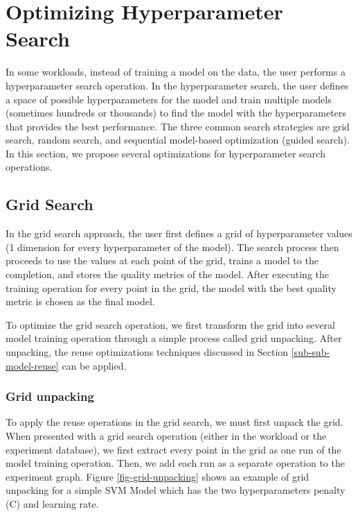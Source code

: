 \section{Optimizing Hyperparameter Search} \label{sec-hyperparam-optimization}
In some workloads, instead of training a model on the data, the user performs a hyperparameter search operation.
In the hyperparameter search, the user defines a space of possible hyperparameters for the model and train multiple models (sometimes hundreds or thousands) to find the model with the hyperparameters that provides the best performance.
The three common search strategies are grid search, random search, and sequential model-based optimization (guided search).
In this section, we propose several optimizations for hyperparameter search operations.
\subsection{Grid Search}
In the grid search approach, the user first defines a grid of hyperparameter values (1 dimension for every hyperparameter of the model).
The search process then proceeds to use the values at each point of the grid, trains a model to the completion, and stores the quality metrics of the model.
After executing the training operation for every point in the grid, the model with the best quality metric is chosen as the final model.

To optimize the grid search operation, we first transform the grid into several model training operation through a simple process called grid unpacking.
After unpacking, the reuse optimizations techniques discussed in Section \ref{sub-sub-model-reuse} can be applied.

\subsubsection{Grid unpacking}
To apply the reuse operations in the grid search, we must first unpack the grid.
When presented with a grid search operation (either in the workload or the experiment database), we first extract every point in the grid as one run of the model training operation.
Then, we add each run as a separate operation to the experiment graph.
Figure \ref{fig-grid-unpacking} shows an example of grid unpacking for a simple SVM Model which has the two hyperparameters penalty (C) and learning rate.

